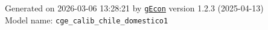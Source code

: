 \documentclass[10pt,a4paper]{article}
\numberwithin{equation}{section}
\begin{document}
\begin{landscape}
\begin{flushleft}{\large
Generated  on 2026-03-06 13:28:21 by \href{http://gecon.r-forge.r-project.org/}{\texttt{gEcon}} version 1.2.3 (2025-04-13)\\
Model name: \verb+cge_calib_chile_domestico1+
}\end{flushleft}


\end{landscape}

\end{document}
